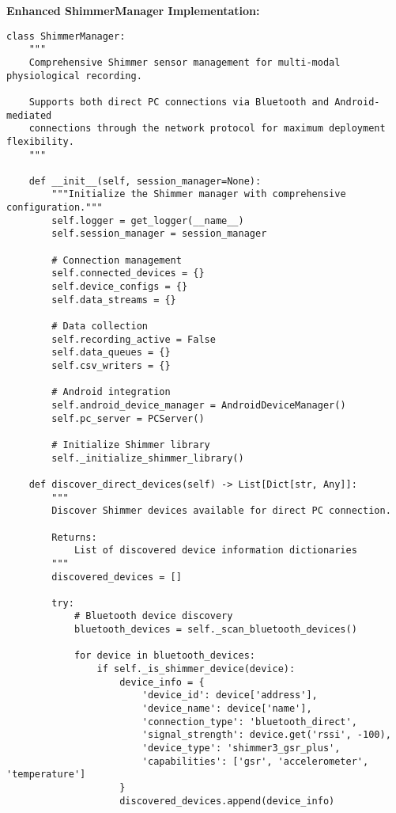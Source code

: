 \documentclass[12pt,a4paper]{article}
\begin{document}
\textbf{Enhanced ShimmerManager Implementation:}

\begin{verbatim}
class ShimmerManager:
    """
    Comprehensive Shimmer sensor management for multi-modal physiological recording.
    
    Supports both direct PC connections via Bluetooth and Android-mediated
    connections through the network protocol for maximum deployment flexibility.
    """
    
    def __init__(self, session_manager=None):
        """Initialize the Shimmer manager with comprehensive configuration."""
        self.logger = get_logger(__name__)
        self.session_manager = session_manager
        
        # Connection management
        self.connected_devices = {}
        self.device_configs = {}
        self.data_streams = {}
        
        # Data collection
        self.recording_active = False
        self.data_queues = {}
        self.csv_writers = {}
        
        # Android integration
        self.android_device_manager = AndroidDeviceManager()
        self.pc_server = PCServer()
        
        # Initialize Shimmer library
        self._initialize_shimmer_library()
        
    def discover_direct_devices(self) -> List[Dict[str, Any]]:
        """
        Discover Shimmer devices available for direct PC connection.
        
        Returns:
            List of discovered device information dictionaries
        """
        discovered_devices = []
        
        try:
            # Bluetooth device discovery
            bluetooth_devices = self._scan_bluetooth_devices()
            
            for device in bluetooth_devices:
                if self._is_shimmer_device(device):
                    device_info = {
                        'device_id': device['address'],
                        'device_name': device['name'],
                        'connection_type': 'bluetooth_direct',
                        'signal_strength': device.get('rssi', -100),
                        'device_type': 'shimmer3_gsr_plus',
                        'capabilities': ['gsr', 'accelerometer', 'temperature']
                    }
                    discovered_devices.append(device_info)
                    

\end{verbatim}
\end{document}
